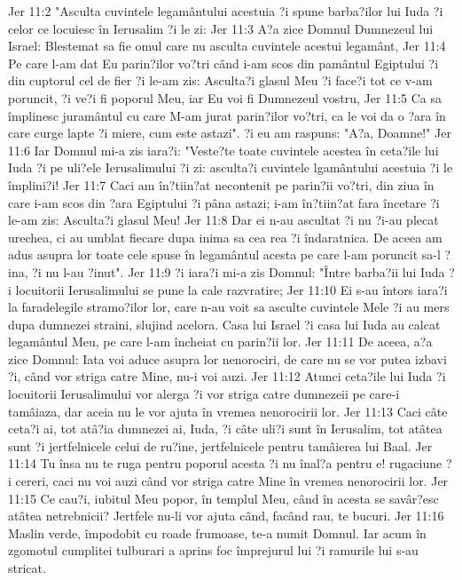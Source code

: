 Jer 11:2  "Asculta cuvintele legamântului acestuia ?i spune barba?ilor lui Iuda ?i celor ce locuiesc în Ierusalim ?i le zi:
Jer 11:3  A?a zice Domnul Dumnezeul lui Israel: Blestemat sa fie omul care nu asculta cuvintele acestui legamânt,
Jer 11:4  Pe care l-am dat Eu parin?ilor vo?tri când i-am scos din pamântul Egiptului ?i din cuptorul cel de fier ?i le-am zis: Asculta?i glasul Meu ?i face?i tot ce v-am poruncit, ?i ve?i fi poporul Meu, iar Eu voi fi Dumnezeul vostru,
Jer 11:5  Ca sa împlinesc juramântul cu care M-am jurat parin?ilor vo?tri, ca le voi da o ?ara în care curge lapte ?i miere, cum este astazi". ?i eu am raspuns: "A?a, Doamne!"
Jer 11:6  Iar Domnul mi-a zis iara?i: "Veste?te toate cuvintele acestea în ceta?ile lui Iuda ?i pe uli?ele Ierusalimului ?i zi: asculta?i cuvintele lgamântului acestuia ?i le împlini?i!
Jer 11:7  Caci am în?tiin?at necontenit pe parin?ii vo?tri, din ziua în care i-am scos din ?ara Egiptului ?i pâna astazi; i-am în?tiin?at fara încetare ?i le-am zis: Asculta?i glasul Meu!
Jer 11:8  Dar ei n-au ascultat ?i nu ?i-au plecat urechea, ci au umblat fiecare dupa inima sa cea rea ?i îndaratnica. De aceea am adus asupra lor toate cele spuse în legamântul acesta pe care l-am poruncit sa-l ?ina, ?i nu l-au ?inut".
Jer 11:9  ?i iara?i mi-a zis Domnul: "Între barba?ii lui Iuda ?i locuitorii Ierusalimului se pune la cale razvratire;
Jer 11:10  Ei s-au întors iara?i la faradelegile stramo?ilor lor, care n-au voit sa asculte cuvintele Mele ?i au mers dupa dumnezei straini, slujind acelora. Casa lui Israel ?i casa lui Iuda au calcat legamântul Meu, pe care l-am încheiat cu parin?ii lor.
Jer 11:11  De aceea, a?a zice Domnul: Iata voi aduce asupra lor nenorociri, de care nu se vor putea izbavi ?i, când vor striga catre Mine, nu-i voi auzi.
Jer 11:12  Atunci ceta?ile lui Iuda ?i locuitorii Ierusalimului vor alerga ?i vor striga catre dumnezeii pe care-i tamâiaza, dar aceia nu le vor ajuta în vremea nenorocirii lor.
Jer 11:13  Caci câte ceta?i ai, tot atâ?ia dumnezei ai, Iuda, ?i câte uli?i sunt în Ierusalim, tot atâtea sunt ?i jertfelnicele celui de ru?ine, jertfelnicele pentru tamâierea lui Baal.
Jer 11:14  Tu însa nu te ruga pentru poporul acesta ?i nu înal?a pentru e! rugaciune ?i cereri, caci nu voi auzi când vor striga catre Mine în vremea nenorocirii lor.
Jer 11:15  Ce cau?i, iubitul Meu popor, în templul Meu, când în acesta se savâr?esc atâtea netrebnicii? Jertfele nu-li vor ajuta când, facând rau, te bucuri.
Jer 11:16  Maslin verde, împodobit cu roade frumoase, te-a numit Domnul. Iar acum în zgomotul cumplitei tulburari a aprins foc împrejurul lui ?i ramurile lui s-au stricat.
